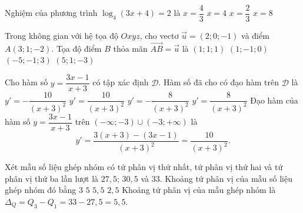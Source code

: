 \begin{ex}%
	Nghiệm của phương trình $\log_4(3x+4)=2$ là
	\choice
	{$x=\dfrac{4}{3}$}
	{\True $x=4$}
	{$x=\dfrac{2}{3}$}
	{$x=8$}
\end{ex}

\begin{ex}%
	Trong không gian với hệ tọa độ $Oxyz$, cho vectơ $\overrightarrow{u}=(2; 0; -1)$ và điểm $A(3; 1; -2)$. Tọa độ điểm $B$ thỏa mãn $\overrightarrow{AB}=\overrightarrow{u}$ là
	\choice
	{$(1; 1; 1)$}
	{$(1; -1; 0)$}
	{$(-5; -1; 3)$}
	{\True $(5; 1; -3)$}
\end{ex}

\begin{ex}%
	Cho hàm số $y=\dfrac{3x-1}{x+3}$ có tập xác định $\mathscr{D}$. Hàm số đã cho có đạo hàm trên $\mathscr{D}$ là
	\choice
	{$y'=-\dfrac{10}{(x+3)^2}$}
	{\True $y'=\dfrac{10}{(x+3)^2}$}
	{$y'=-\dfrac{8}{(x+3)^2}$}
	{$y'=\dfrac{8}{(x+3)^2}$}
	\loigiai
	{Đạo hàm của hàm số $y=\dfrac{3x-1}{x+3}$ trên $(-\infty;-3) \cup (-3;+\infty)$ là 
		$$y'=\dfrac{3(x+3)-(3x-1)}{(x+3)^2}=\dfrac{10}{(x+3)^2}.$$}
\end{ex}

\begin{ex}%
	Xét mẫu số liệu ghép nhóm có tứ phân vị thứ nhất, tứ phân vị thứ hai và tứ phân vị thứ ba lần lượt là $27{,}5$; $30{,}5$ và $33$. Khoảng tứ phân vị của mẫu số liệu ghép nhóm đó bằng
	\choice
	{$3$}
	{$5$}
	{\True $5{,}5$}
	{$2{,}5$}
	\loigiai
	{Khoảng tứ phân vị của mẫu ghép nhóm là $\Delta_Q=Q_3-Q_1=33-27{,}5=5{,}5$.}
\end{ex}

